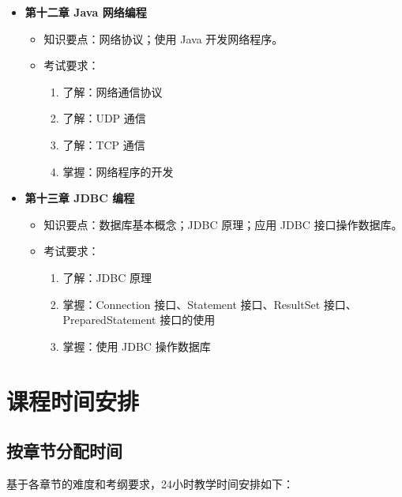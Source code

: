 \documentclass{../note}
\begin{document}
\begin{itemize}
  \item \textbf{第十二章 Java 网络编程}
    \begin{itemize}
      \item 知识要点：网络协议；使用 Java 开发网络程序。
      \item 考试要求：
        \begin{enumerate}
          \item 了解：网络通信协议
          \item 了解：UDP 通信
          \item 了解：TCP 通信
          \item 掌握：网络程序的开发
        \end{enumerate}
    \end{itemize}

  \item \textbf{第十三章 JDBC 编程}
    \begin{itemize}
      \item 知识要点：数据库基本概念；JDBC 原理；应用 JDBC 接口操作数据库。
      \item 考试要求：
        \begin{enumerate}
          \item 了解：JDBC 原理
          \item 掌握：Connection 接口、Statement 接口、ResultSet 接口、PreparedStatement 接口的使用
          \item 掌握：使用 JDBC 操作数据库
        \end{enumerate}
    \end{itemize}
\end{itemize}

\section{课程时间安排}

\subsection{按章节分配时间}
基于各章节的难度和考纲要求，24小时教学时间安排如下：
\end{document}
